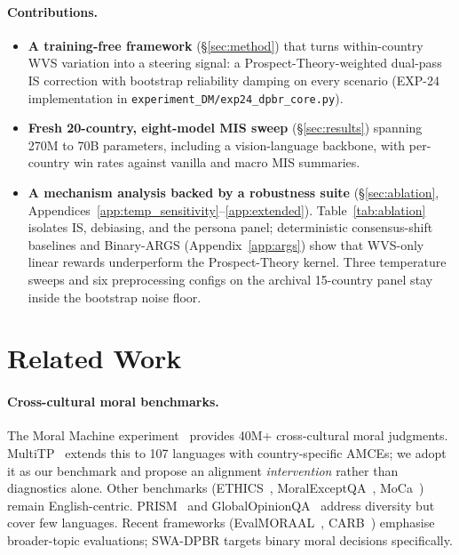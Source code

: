 \documentclass{article}
\begin{document}
\paragraph{Contributions.}
\begin{itemize}
  \item \textbf{A training-free framework} (\S\ref{sec:method}) that turns
        within-country WVS variation into a steering signal: a Prospect-Theory-weighted
        dual-pass IS correction with bootstrap reliability damping on every scenario
        (EXP-24 implementation in \texttt{experiment\_DM/exp24\_dpbr\_core.py}).
  \item \textbf{Fresh 20-country, eight-model MIS sweep} (\S\ref{sec:results})
        spanning 270M to 70B parameters, including a vision-language backbone,
        with per-country win rates against vanilla and macro MIS summaries.
  \item \textbf{A mechanism analysis backed by a robustness suite}
        (\S\ref{sec:ablation}, Appendices~\ref{app:temp_sensitivity}--\ref{app:extended}).
        Table~\ref{tab:ablation} isolates IS, debiasing, and
        the persona panel; deterministic consensus-shift baselines and Binary-ARGS
        (Appendix~\ref{app:args}) show that WVS-only linear rewards underperform the
        Prospect-Theory kernel.
        Three temperature sweeps and six preprocessing
        configs on the archival 15-country panel stay inside the bootstrap noise floor.
\end{itemize}

\section{Related Work}
\label{sec:related}

\paragraph{Cross-cultural moral benchmarks.}
The Moral Machine experiment~\citep{awad2018moral} provides 40M+ cross-cultural moral
judgments. MultiTP~\citep{jin2025multitp} extends this to 107 languages with
country-specific AMCEs; we adopt it as our benchmark and propose an alignment
\emph{intervention} rather than diagnostics alone. Other benchmarks
(ETHICS~\citep{hendrycks2021aligning}, MoralExceptQA~\citep{jin2022exceptions},
MoCa~\citep{nie2023moca}) remain English-centric.
PRISM~\citep{kirk2024prism} and GlobalOpinionQA~\citep{durmus2023global} address
diversity but cover few languages. Recent frameworks
(EvalMORAAL~\citep{aakanksha2024evalmor}, CARB~\citep{myung2024carb}) emphasise
broader-topic evaluations; SWA-DPBR targets binary moral decisions specifically.
\end{document}
